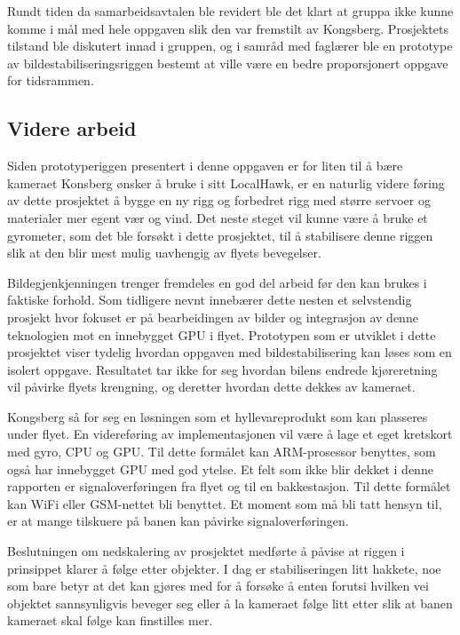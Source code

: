 Rundt tiden da samarbeidsavtalen ble revidert ble det klart at gruppa ikke kunne komme i mål med hele oppgaven slik den var fremstilt av Kongsberg. Prosjektets tilstand ble diskutert innad i gruppen, og i samråd med faglærer ble en prototype av bildestabiliseringsriggen bestemt at ville være en bedre proporsjonert oppgave for tidsrammen.

\subsection{Videre arbeid}
Siden prototyperiggen presentert i denne oppgaven er for liten til å bære kameraet Konsberg ønsker å bruke i sitt LocalHawk, er en naturlig videre føring av dette prosjektet å bygge en ny rigg og forbedret rigg med større servoer og materialer mer egent vær og vind. Det neste steget vil kunne være å bruke et gyrometer, som det ble forsøkt i dette prosjektet, til å stabilisere denne riggen slik at den blir mest mulig uavhengig av flyets bevegelser. 

Bildegjenkjenningen trenger fremdeles en god del arbeid før den kan brukes i faktiske forhold. Som tidligere nevnt innebærer dette nesten et selvstendig prosjekt hvor fokuset er på bearbeidingen av bilder og integrasjon av denne teknologien mot en innebygget GPU i flyet. Prototypen som er utviklet i dette prosjektet viser tydelig hvordan oppgaven med bildestabilisering kan løses som en isolert oppgave. Resultatet tar ikke for seg hvordan bilens endrede kjøreretning vil påvirke flyets krengning, og deretter hvordan dette dekkes av kameraet.

Kongsberg så for seg en løsningen som et hyllevareprodukt som kan plasseres under flyet. En videreføring av implementasjonen vil være å lage et eget kretskort med gyro, CPU og GPU. Til dette formålet kan ARM-prosessor benyttes, som også har innebygget GPU med god ytelse. Et felt som ikke blir dekket i denne rapporten er signaloverføringen fra flyet og til en bakkestasjon. Til dette formålet kan WiFi eller GSM-nettet bli benyttet. Et moment som må bli tatt hensyn til, er at mange tilskuere på banen kan påvirke signaloverføringen.

Beslutningen om nedskalering av prosjektet medførte å påvise at riggen i prinsippet klarer å følge etter objekter. I dag er stabiliseringen litt hakkete, noe som bare betyr at det kan gjøres med for å forsøke å enten forutsi hvilken vei objektet sannsynligvis beveger seg eller å la kameraet følge litt etter slik at banen kameraet skal følge kan finstilles mer.

